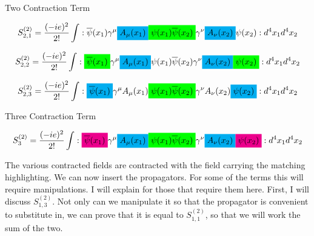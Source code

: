 \documentclass[a4]{article}
\newcommand{\highlight}[2][yellow]{\mathchoice
  {\colorbox{#1}{$\displaystyle#2$}}
  {\colorbox{#1}{$\textstyle#2$}}
  {\colorbox{#1}{$\scriptstyle#2$}}
  {\colorbox{#1}{$\scriptscriptstyle#2$}}}
\begin{document}
\begin{framed}
            \begin{center}
                Two Contraction Term
            \end{center}

            \begin{equation}
                S^{(2)}_{2,1} = \frac{(-ie)^2}{2!} \int :\overline{\psi} (x_1) \gamma^{\mu} \highlight[cyan]{A_{\mu} (x_1)} \highlight[green]{\psi (x_1) \overline{\psi} (x_2)} \gamma^{\nu} \highlight[cyan]{A_{\nu} (x_2)} \psi (x_2): d^{4} x_{1} d^{4} x_{2}
            \end{equation}

            \begin{equation}
                S^{(2)}_{2,2} = \frac{(-ie)^2}{2!} \int :\highlight[green]{\overline{\psi} (x_1)} \gamma^{\mu} \highlight[cyan]{A_{\mu} (x_1)} \psi (x_1) \overline{\psi} (x_2) \gamma^{\nu} \highlight[cyan]{A_{\nu} (x_2)} \highlight[green]{\psi (x_2)}: d^{4} x_{1} d^{4} x_{2}
            \end{equation}

            \begin{equation}
                S^{(2)}_{2,3} = \frac{(-ie)^2}{2!} \int :\highlight[cyan]{\overline{\psi} (x_1)} \gamma^{\mu} A_{\mu} (x_1) \highlight[green]{\psi (x_1) \overline{\psi} (x_2)} \gamma^{\nu} A_{\nu} (x_2)  \highlight[cyan]{\psi (x_2)}: d^{4} x_{1} d^{4} x_{2}
            \end{equation}

            \begin{center}
                Three Contraction Term
            \end{center}

            \begin{equation}
                S^{(2)}_{3} = \frac{(-ie)^2}{2!} \int :\highlight[magenta]{\overline{\psi} (x_1)} \gamma^{\mu} \highlight[cyan]{A_{\mu} (x_1)} \highlight[green]{\psi (x_1) \overline{\psi} (x_2)} \gamma^{\nu} \highlight[cyan]{A_{\nu} (x_2)} \highlight[magenta]{\psi (x_2)}: d^{4} x_{1} d^{4} x_{2}
            \end{equation}

        \end{framed}

        The various contracted fields are contracted with the field carrying the matching highlighting. We can now insert the propagators. For some of the terms this will require manipulations. I will explain for those that require them here.
        First, I will discuss $S^{(2)}_{1,3}$. Not only can we manipulate it so that the propagator is convenient to substitute in, we can prove that it is equal to $S^{(2)}_{1,1}$, so that we will work the sum of the two.
\end{document}
